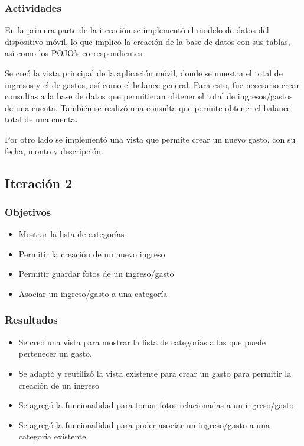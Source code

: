 \subsubsection{Actividades}
En la primera parte de la iteración se implementó el modelo de datos del dispositivo móvil, lo que implicó la creación de la base de datos con sus tablas, así como los POJO's correspondientes.

Se creó la vista principal de la aplicación móvil, donde se muestra el total de ingresos y el de gastos, así como el balance general. Para esto, fue necesario crear consultas a la base de datos que permitieran obtener el total de ingresos/gastos de una cuenta.  También se realizó una consulta que permite obtener el balance total de una cuenta.

Por otro lado se implementó una vista que permite crear un nuevo gasto, con su fecha, monto y descripción.


\subsection{Iteración 2}

\subsubsection{Objetivos}
\begin{itemize}
\item Mostrar la lista de categorías
\item Permitir la creación de un nuevo ingreso
\item Permitir guardar fotos de un ingreso/gasto
\item Asociar un ingreso/gasto a una categoría
\end{itemize}

\subsubsection{Resultados}
\begin{itemize}
\item Se creó una vista para mostrar la lista de categorías a las que puede pertenecer un gasto.
\item Se adaptó y reutilizó la vista existente para crear un gasto para permitir la creación de un ingreso
\item Se agregó la funcionalidad para tomar fotos relacionadas a un ingreso/gasto
\item Se agregó la funcionalidad para poder asociar un ingreso/gasto a una categoría existente

\end{itemize}

